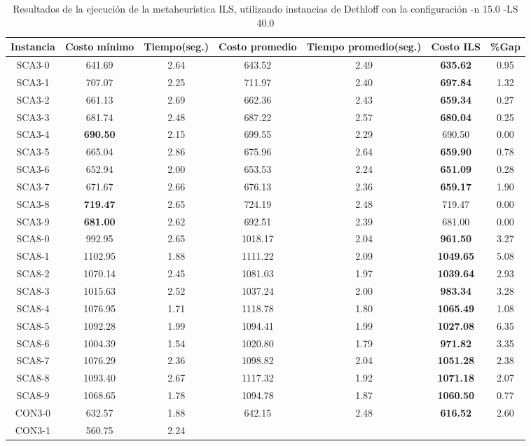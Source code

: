 \begin{table}[ht]
\caption{Resultados de la ejecución de la metaheurística ILS, utilizando instancias de Dethloff con la configuración -n 15.0 -LS 40.0}
\centering
\small
\begin{tabular}{c c c c c c c}
\hline\hline
Instancia & Costo mínimo & Tiempo(seg.) & Costo promedio & Tiempo promedio(seg.) & Costo ILS & \%Gap \\ [0.5ex]
\hline
SCA3-0 & 641.69 & 2.64 & 
643.52 & 2.49 & \bf{635.62} & 
0.95\\SCA3-1 & 707.07 & 2.25 & 
711.97 & 2.40 & \bf{697.84} & 
1.32\\SCA3-2 & 661.13 & 2.69 & 
662.36 & 2.43 & \bf{659.34} & 
0.27\\SCA3-3 & 681.74 & 2.48 & 
687.22 & 2.57 & \bf{680.04} & 
0.25\\SCA3-4 & \bf{690.50} & 2.15 & 
699.55 & 2.29 & 690.50 & 0.00\\
SCA3-5 & 665.04 & 2.86 & 
675.96 & 2.64 & \bf{659.90} & 
0.78\\SCA3-6 & 652.94 & 2.00 & 
653.53 & 2.24 & \bf{651.09} & 
0.28\\SCA3-7 & 671.67 & 2.66 & 
676.13 & 2.36 & \bf{659.17} & 
1.90\\SCA3-8 & \bf{719.47} & 2.65 & 
724.19 & 2.48 & 719.47 & 0.00\\
SCA3-9 & \bf{681.00} & 2.62 & 
692.51 & 2.39 & 681.00 & 0.00\\
SCA8-0 & 992.95 & 2.65 & 
1018.17 & 2.04 & \bf{961.50} & 
3.27\\SCA8-1 & 1102.95 & 1.88 & 
1111.22 & 2.09 & \bf{1049.65} & 
5.08\\SCA8-2 & 1070.14 & 2.45 & 
1081.03 & 1.97 & \bf{1039.64} & 
2.93\\SCA8-3 & 1015.63 & 2.52 & 
1037.24 & 2.00 & \bf{983.34} & 
3.28\\SCA8-4 & 1076.95 & 1.71 & 
1118.78 & 1.80 & \bf{1065.49} & 
1.08\\SCA8-5 & 1092.28 & 1.99 & 
1094.41 & 1.99 & \bf{1027.08} & 
6.35\\SCA8-6 & 1004.39 & 1.54 & 
1020.80 & 1.79 & \bf{971.82} & 
3.35\\SCA8-7 & 1076.29 & 2.36 & 
1098.82 & 2.04 & \bf{1051.28} & 
2.38\\SCA8-8 & 1093.40 & 2.67 & 
1117.32 & 1.92 & \bf{1071.18} & 
2.07\\SCA8-9 & 1068.65 & 1.78 & 
1094.78 & 1.87 & \bf{1060.50} & 
0.77\\CON3-0 & 632.57 & 1.88 & 
642.15 & 2.48 & \bf{616.52} & 
2.60\\CON3-1 & 560.75 & 2.24 & 

\end{tabular}
\end{table}
